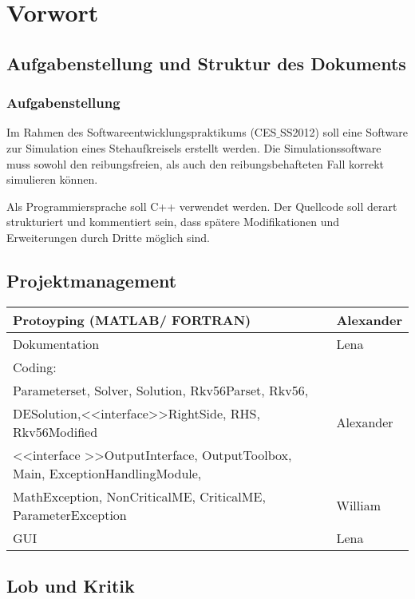 \chapter{Vorwort}
\label{ch:1}

\section{Aufgabenstellung und Struktur des Dokuments}
\label{sec:1.1}

\subsection*{Aufgabenstellung}

{Im Rahmen des Softwareentwicklungspraktikums (CES$\_$SS2012) soll eine Software zur Simulation eines Stehaufkreisels erstellt werden.
Die Simulationssoftware muss sowohl den reibungsfreien, als auch den reibungsbehafteten Fall korrekt simulieren können.

Als Programmiersprache soll C++ verwendet werden. Der Quellcode soll derart strukturiert
und kommentiert sein, dass sp\"atere Modifikationen und Erweiterungen durch Dritte m\"oglich sind.}

\section{Projektmanagement}
\label{sec:1.2}

{
\begin{tabular}{l || l}
  \hline
  \hline
	Protoyping (MATLAB/ FORTRAN)& Alexander \\
	\hline
	Dokumentation &Lena \\
	\hline
	\hline
	Coding:& \\
	\hline
	Parameterset, Solver, Solution, Rkv56Parset, Rkv56,\\ DESolution,\textless  \textless interface\textgreater \textgreater RightSide, RHS, Rkv56Modified & Alexander\\
	\hline
	\textless \textless interface \textgreater \textgreater OutputInterface, OutputToolbox, Main, ExceptionHandlingModule,\\ MathException, NonCriticalME, CriticalME, ParameterException & William\\
	\hline
	GUI & Lena \\
	\hline
	\hline
\end{tabular}
}

\section{Lob und Kritik}
\label{sec:1.3}


